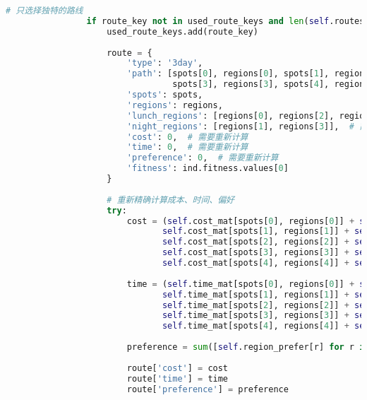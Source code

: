 \begin{lstlisting}[language=Python]
                # 只选择独特的路线
                if route_key not in used_route_keys and len(self.routes_3day_candidates) < candidate_size:
                    used_route_keys.add(route_key)
                    
                    route = {
                        'type': '3day',
                        'path': [spots[0], regions[0], spots[1], regions[1], spots[2], regions[2], 
                                 spots[3], regions[3], spots[4], regions[4], spots[5]],
                        'spots': spots,
                        'regions': regions,
                        'lunch_regions': [regions[0], regions[2], regions[4]],  # 3天的午餐
                        'night_regions': [regions[1], regions[3]],  # 前2天的住宿
                        'cost': 0,  # 需要重新计算
                        'time': 0,  # 需要重新计算
                        'preference': 0,  # 需要重新计算
                        'fitness': ind.fitness.values[0]
                    }
                    
                    # 重新精确计算成本、时间、偏好
                    try:
                        cost = (self.cost_mat[spots[0], regions[0]] + self.cost_mat[spots[1], regions[0]] +
                               self.cost_mat[spots[1], regions[1]] + self.cost_mat[spots[2], regions[1]] +
                               self.cost_mat[spots[2], regions[2]] + self.cost_mat[spots[3], regions[2]] +
                               self.cost_mat[spots[3], regions[3]] + self.cost_mat[spots[4], regions[3]] +
                               self.cost_mat[spots[4], regions[4]] + self.cost_mat[spots[5], regions[4]])
                        
                        time = (self.time_mat[spots[0], regions[0]] + self.time_mat[spots[1], regions[0]] +
                               self.time_mat[spots[1], regions[1]] + self.time_mat[spots[2], regions[1]] +
                               self.time_mat[spots[2], regions[2]] + self.time_mat[spots[3], regions[2]] +
                               self.time_mat[spots[3], regions[3]] + self.time_mat[spots[4], regions[3]] +
                               self.time_mat[spots[4], regions[4]] + self.time_mat[spots[5], regions[4]])
                        
                        preference = sum([self.region_prefer[r] for r in regions]) + 6
                        
                        route['cost'] = cost
                        route['time'] = time
                        route['preference'] = preference
                        

\end{lstlisting}
